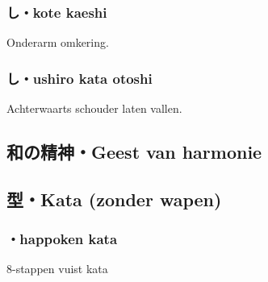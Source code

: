 \subsubsection{し・kote kaeshi}
Onderarm omkering.

\subsubsection{し・ushiro kata otoshi}
Achterwaarts schouder laten vallen.

\subsection{和の精神・Geest van harmonie}

\subsection{型・Kata (zonder wapen)}
\subsubsection{・happoken kata}
8-stappen vuist kata

